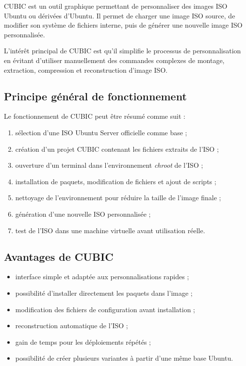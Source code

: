 \documentclass[12pt,a4paper]{article}
\begin{document}
CUBIC est un outil graphique permettant de personnaliser des images ISO Ubuntu ou dérivées d'Ubuntu. Il permet de charger une image ISO source, de modifier son système de fichiers interne, puis de générer une nouvelle image ISO personnalisée.

L'intérêt principal de CUBIC est qu'il simplifie le processus de personnalisation en évitant d'utiliser manuellement des commandes complexes de montage, extraction, compression et reconstruction d'image ISO.

\subsection{Principe général de fonctionnement}

Le fonctionnement de CUBIC peut être résumé comme suit :

\begin{enumerate}
    \item sélection d'une ISO Ubuntu Server officielle comme base ;
    \item création d'un projet CUBIC contenant les fichiers extraits de l'ISO ;
    \item ouverture d'un terminal dans l'environnement \textit{chroot} de l'ISO ;
    \item installation de paquets, modification de fichiers et ajout de scripts ;
    \item nettoyage de l'environnement pour réduire la taille de l'image finale ;
    \item génération d'une nouvelle ISO personnalisée ;
    \item test de l'ISO dans une machine virtuelle avant utilisation réelle.
\end{enumerate}

\subsection{Avantages de CUBIC}

\begin{itemize}[label=--]
    \item interface simple et adaptée aux personnalisations rapides ;
    \item possibilité d'installer directement les paquets dans l'image ;
    \item modification des fichiers de configuration avant installation ;
    \item reconstruction automatique de l'ISO ;
    \item gain de temps pour les déploiements répétés ;
    \item possibilité de créer plusieurs variantes à partir d'une même base Ubuntu.
\end{itemize}
\end{document}
